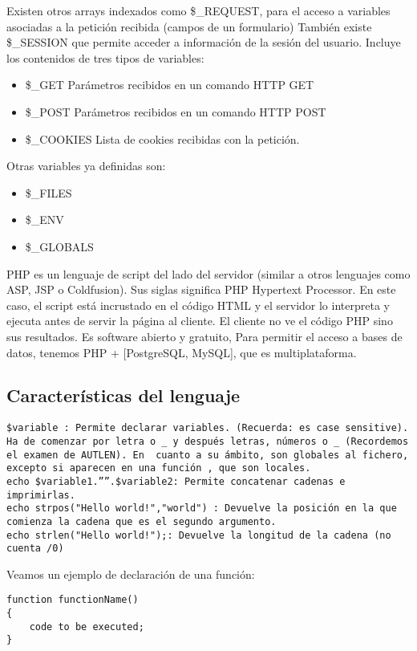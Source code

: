 \documentclass{apuntes}
\begin{document}
Existen otros arrays indexados como \$\_REQUEST, para el acceso a variables asociadas a la petición recibida (campos de un formulario)
También existe \$\_SESSION que permite acceder a información de la sesión del usuario. Incluye los contenidos de tres tipos de variables:
\begin{itemize}
\item \$\_GET Parámetros recibidos en un comando HTTP GET
\item \$\_POST Parámetros recibidos en un comando HTTP POST
\item \$\_COOKIES Lista de cookies recibidas con la petición.
\end{itemize}

Otras variables ya definidas son:
\begin{itemize}
\item\$\_FILES
\item\$\_ENV
\item\$\_GLOBALS
\end{itemize}

PHP es un lenguaje de script del lado del servidor (similar a otros lenguajes como ASP, JSP o Coldfusion). Sus siglas significa PHP Hypertext Processor. En este caso, el script está incrustado en el código HTML y el servidor lo interpreta y ejecuta antes de servir la página al cliente. El cliente no ve el código PHP sino sus resultados. Es software abierto y gratuito, Para permitir el acceso a bases de datos, tenemos PHP + [PostgreSQL, MySQL], que es multiplataforma.

\subsection{Características del lenguaje}
\begin{verbatim}
$variable : Permite declarar variables. (Recuerda: es case sensitive). Ha de comenzar por letra o _ y después letras, números o _ (Recordemos el examen de AUTLEN). En  cuanto a su ámbito, son globales al fichero, excepto si aparecen en una función , que son locales.
echo $variable1.””.$variable2: Permite concatenar cadenas e imprimirlas.
echo strpos("Hello world!","world") : Devuelve la posición en la que comienza la cadena que es el segundo argumento.
echo strlen("Hello world!");: Devuelve la longitud de la cadena (no cuenta /0)
\end{verbatim}

Veamos un ejemplo de declaración de una función:
\begin{verbatim}
function functionName()
{
    code to be executed;
}
\end{verbatim}
\end{document}
